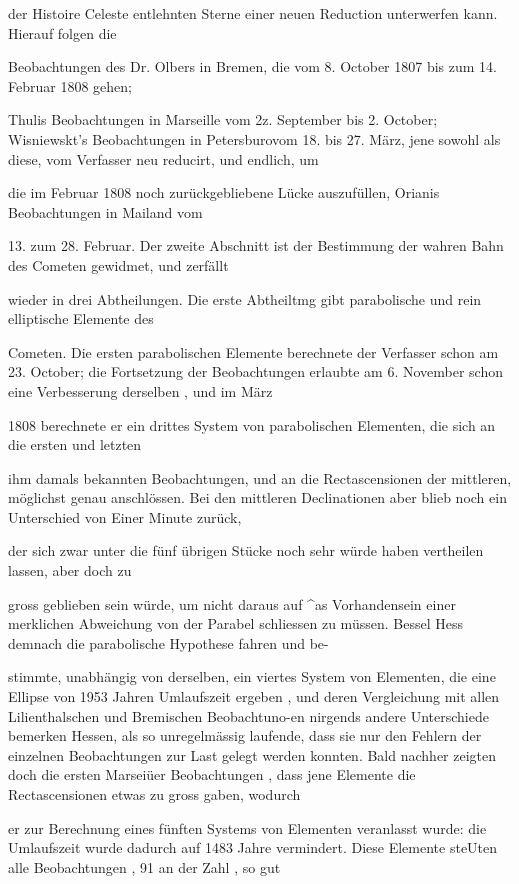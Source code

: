 \documentclass[10pt,a4paper]{article}
\begin{document}
der Histoire Celeste entlehnten Sterne einer neuen Reduction unterwerfen kann. Hierauf folgen die

Beobachtungen des Dr. Olbers in Bremen, die vom 8. October 1807 bis zum 14. Februar 1808 gehen;

Thulis Beobachtungen in Marseille vom 2z. September bis 2. October; Wisniewskt's Beobachtungen in Petersburovom 18. bis 27. März, jene sowohl als diese, vom Verfasser neu reducirt, und endlich, um

die im Februar 1808 noch zurückgebliebene Lücke auszufüllen, Orianis Beobachtungen in Mailand vom

13. zum 28. Februar. Der zweite Abschnitt ist der Bestimmung der wahren Bahn des Cometen gewidmet, und zerfällt

wieder in drei Abtheilungen. Die erste Abtheiltmg gibt parabolische und rein elliptische Elemente des

Cometen. Die ersten parabolischen Elemente berechnete der Verfasser schon am 23. October; die Fortsetzung der Beobachtungen erlaubte am 6. November schon eine Verbesserung derselben , und im März

1808 berechnete er ein drittes System von parabolischen Elementen, die sich an die ersten und letzten

ihm damals bekannten Beobachtungen, und an die Rectascensionen der mittleren, möglichst genau anschlössen. Bei den mittleren Declinationen aber blieb noch ein Unterschied von Einer Minute zurück,

der sich zwar unter die fünf übrigen Stücke noch sehr würde haben vertheilen lassen, aber doch zu

gross geblieben sein würde, um nicht daraus auf \textasciicircum{}as Vorhandensein einer merklichen Abweichung von der Parabel schliessen zu müssen. Bessel Hess demnach die parabolische Hypothese fahren und be-

stimmte, unabhängig von derselben, ein viertes System von Elementen, die eine Ellipse von 1953 Jahren Umlaufszeit ergeben , und deren Vergleichung mit allen Lilienthalschen und Bremischen Beobachtuno-en nirgends andere Unterschiede bemerken Hessen, als so unregelmässig laufende, dass sie nur den Fehlern der einzelnen Beobachtungen zur Last gelegt werden konnten. Bald nachher zeigten doch die ersten Marseiüer Beobachtungen , dass jene Elemente die Rectascensionen etwas zu gross gaben, wodurch

er zur Berechnung eines fünften Systems von Elementen veranlasst wurde: die Umlaufszeit wurde dadurch auf 1483 Jahre vermindert. Diese Elemente steUten alle Beobachtungen , 91 an der Zahl , so gut
\end{document}
